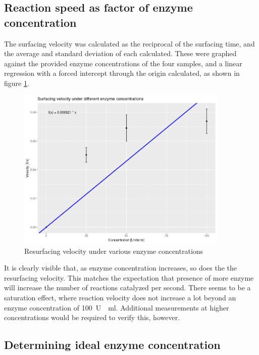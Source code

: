 \documentclass[a4paper,english]{scrreprt}
\begin{document}
\subsection{Reaction speed as factor of enzyme concentration}

The surfacing velocity was calculated as the reciprocal of the surfacing time,
and the average and standard deviation of each calculated. These were graphed
against the provided enzyme concentrations of the four samples, and a linear
regression with a forced intercept through the origin calculated, as shown in
figure \ref{fig:enzyme_optimal_concentration}.

\begin{figure}
	\centering
	\includegraphics[width=0.9\textwidth]{img/optimal_concentration.png}
	\caption{Resurfacing velocity under various enzyme concentrations}
	\label{fig:enzyme_optimal_concentration}
\end{figure}

It is clearly visible that, as enzyme concentration increases, so does the the
resurfacing velocity. This matches the expectation that presence of more enzyme
will increase the number of reactions catalyzed per second. There seems to be a
saturation effect, where reaction velocity does not increase a lot beyond an
enzyme concentration of \SI{100}{U \per \ml}. Additional measurements at higher
concentrations would be required to verify this, however.

\subsection{Determining ideal enzyme concentration}
\end{document}
